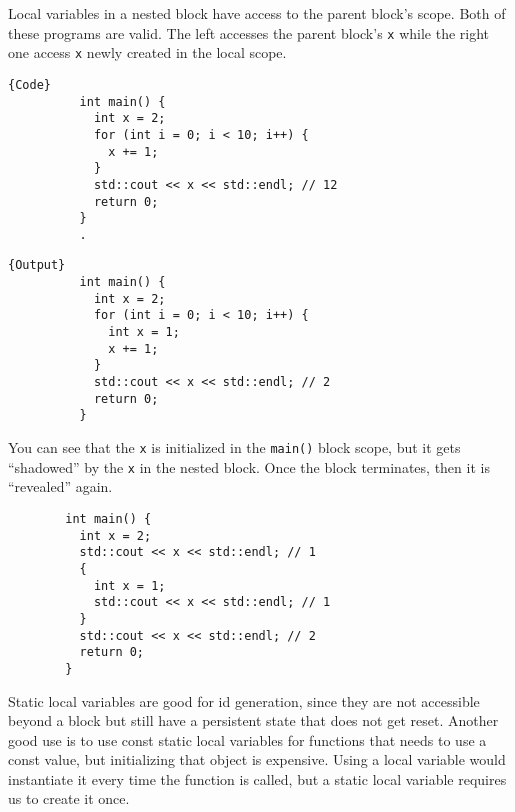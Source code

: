 \documentclass{article}
\begin{document}
    \begin{example}
      Local variables in a nested block have access to the parent block's scope. Both of these programs are valid. The left accesses the parent block's \texttt{x} while the right one access \texttt{x} newly created in the local scope. 

      \noindent\begin{minipage}{.5\textwidth}
        \begin{lstlisting}[]{Code}
          int main() {  
            int x = 2; 
            for (int i = 0; i < 10; i++) {
              x += 1;
            }
            std::cout << x << std::endl; // 12
            return 0; 
          }
          .
        \end{lstlisting}
        \end{minipage}
        \hfill
        \begin{minipage}{.49\textwidth}
        \begin{lstlisting}[]{Output}
          int main() {  
            int x = 2; 
            for (int i = 0; i < 10; i++) {
              int x = 1;
              x += 1;
            }
            std::cout << x << std::endl; // 2
            return 0; 
          }
        \end{lstlisting}
      \end{minipage}
    \end{example}

    \begin{example}
      You can see that the \texttt{x} is initialized in the \texttt{main()} block scope, but it gets ``shadowed'' by the \texttt{x} in the nested block. Once the block terminates, then it is ``revealed'' again. 

      \begin{lstlisting}
        int main() {  
          int x = 2; 
          std::cout << x << std::endl; // 1
          {
            int x = 1;
            std::cout << x << std::endl; // 1
          }
          std::cout << x << std::endl; // 2 
          return 0; 
        }
      \end{lstlisting}
    \end{example} 

    Static local variables are good for id generation, since they are not accessible beyond a block but still have a persistent state that does not get reset. Another good use is to use const static local variables for functions that needs to use a const value, but initializing that object is expensive. Using a local variable would instantiate it every time the function is called, but a static local variable requires us to create it once. 
\end{document}
